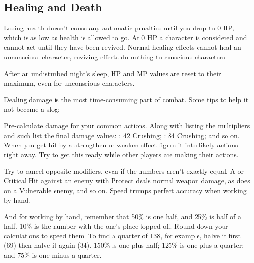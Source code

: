\begin{multicols}{2}
    \subsection{Healing and Death}\label{subsec:heal}
        
        Losing health doesn't cause any automatic penalties until you drop to 0 HP, which is as low as health is allowed to go. At 0 HP a character is considered  and cannot act until they have been revived. Normal healing effects cannot heal an unconscious character, reviving effects do nothing to conscious characters.

        After an undisturbed night's sleep, HP and MP values are reset to their maximum, even for unconscious characters.

    \begin{boco}
        Dealing damage is the most time-consuming part of combat. Some tips to help it not become a slog:

        Pre-calculate damage for your common actions. Along with listing the multipliers and such list the final damage values: : 42 Crushing; : 84 Crushing; and so on. When you get hit by a strengthen or weaken effect figure it into likely actions right away. Try to get this ready while other players are making their actions. 

        Try to cancel opposite modifiers, even if the numbers aren't exactly equal. A  or Critical Hit against an enemy with Protect deals normal weapon damage, as does  on a Vulnerable enemy, and so on. Speed trumps perfect accuracy when working by hand.

        And for working by hand, remember that 50\% is one half, and 25\% is half of a half. 10\% is the number with the one's place lopped off. Round down your calculations to speed them. To find a quarter of 138, for example, halve it first (69) then halve it again (34). 150\% is one plus half; 125\% is one plus a quarter; and 75\% is one minus a quarter.

    \end{boco}




\end{multicols}

